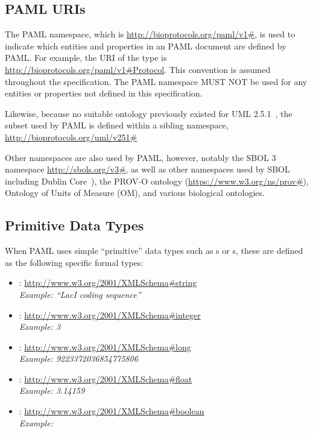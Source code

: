 \subsection{PAML URIs}
 \label{sec:pamlURIs}
  

The PAML namespace, which is \url{http://bioprotocols.org/paml/v1\#}, is used to indicate which entities and properties in an PAML document are defined by PAML. 
For example, the URI of the type  is \url{http://bioprotocols.org/paml/v1\#Protocol}. 
This convention is assumed throughout the specification.
The PAML namespace MUST NOT be used for any entities or properties not defined in this specification.

Likewise, because no suitable ontology previously existed for UML 2.5.1~\citep{uml251}, the subset used by PAML is defined within a sibling namespace, \url{http://bioprotocols.org/uml/v251\#}

Other namespaces are also used by PAML, however, notably the SBOL 3 namespace \url{http://sbols.org/v3\#}, as well as other namespaces used by SBOL including Dublin Core~\citep{dcmi2012}), the PROV-O ontology (\url{https://www.w3.org/ns/prov#}), Ontology of Units of Measure (OM), and various biological ontologies.


\subsection{Primitive Data Types}
\label{sec:datatypes}
\label{sec:string}
\label{sec:integer}
\label{sec:long}
\label{sec:float}
\label{sec:boolean}
\label{sec:URI}
\label{sec:literal}

When PAML uses simple ``primitive'' data types such as s or s, these are defined as the following specific formal types:
\begin{itemize}
\item {}: \url{http://www.w3.org/2001/XMLSchema\#string}\\
  {\em Example: ``LacI coding sequence''}
\item {}: \url{http://www.w3.org/2001/XMLSchema\#integer}\\
  {\em Example: 3}
\item {}: \url{http://www.w3.org/2001/XMLSchema\#long}\\
  {\em Example: 9223372036854775806}
\item {}: \url{http://www.w3.org/2001/XMLSchema\#float}\\
  {\em Example: 3.14159}
\item {}: \url{http://www.w3.org/2001/XMLSchema\#boolean}\\
  {\em Example: }
\end{itemize}

